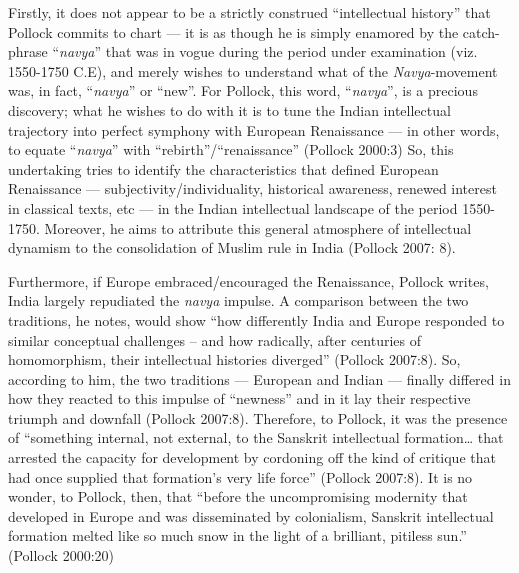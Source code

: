 Firstly, it does not appear to be a strictly construed “intellectual history” that Pollock commits to chart — it is as though he is simply enamored by the catch-phrase “{\sl navya}” that was in vogue during the period under examination (viz. 1550-1750 C.E), and merely wishes to understand what of the {\sl Navya}-movement was, in fact, “{\sl navya}” or “new”. For Pollock, this word, “{\sl navya}”, is a precious discovery; what he wishes to do with it is to tune the Indian intellectual trajectory into perfect symphony with European Renaissance — in other words, to equate “{\sl navya}” with “rebirth”/“renaissance” (Pollock 2000:3) So, this undertaking tries to identify the characteristics that defined European Renaissance — subjectivity/individuality, historical awareness, renewed interest in classical texts, etc — in the Indian intellectual landscape of the period 1550-1750. Moreover, he aims to attribute this general atmosphere of intellectual dynamism to the consolidation of Muslim rule in India (Pollock 2007: 8).

\newpage

Furthermore, if Europe embraced/encouraged the Renaissance, Pollock writes, India largely repudiated the {\sl navya} impulse. A comparison between the two traditions, he notes, would show “how differently India and Europe responded to similar conceptual challenges – and how radically, after centuries of homomorphism, their intellectual histories diverged” (Pollock 2007:8). So, according to him, the two traditions — European and Indian — finally differed in how they reacted to this impulse of “newness” and in it lay their respective triumph and downfall (Pollock 2007:8). Therefore, to Pollock, it was the presence of “something internal, not external, to the Sanskrit intellectual formation… that arrested the capacity for development by cordoning off the kind of critique that had once supplied that formation’s very life force” (Pollock 2007:8). It is no wonder, to Pollock, then, that “before the uncompromising modernity that developed in Europe and was disseminated by colonialism, Sanskrit intellectual formation melted like so much snow in the light of a brilliant, pitiless sun.” (Pollock 2000:20)

